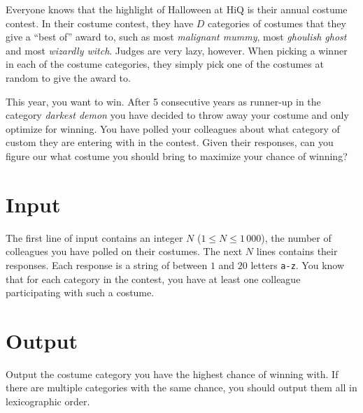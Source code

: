 
\noindent
Everyone knows that the highlight of Halloween at HiQ is their annual costume contest.
In their costume contest, they have $D$ categories of costumes that they give a ``best of'' award to, such as most \emph{malignant mummy}, most \emph{ghoulish ghost} and most \emph{wizardly witch}.
Judges are very lazy, however.
When picking a winner in each of the costume categories, they simply pick one of the costumes at random to give the award to.

This year, you want to win.
After 5 consecutive years as runner-up in the category \emph{darkest demon} you have decided to throw away your costume and only optimize for winning.
You have polled your colleagues about what category of custom they are entering with in the contest.
Given their responses, can you figure our what costume you should bring to maximize your chance of winning?

\section*{Input}
The first line of input contains an integer $N$ ($1 \le N \le 1\,000$), the number of colleagues you have polled on their costumes.
The next $N$ lines contains their responses.
Each response is a string of between $1$ and $20$ letters \texttt{a-z}.
You know that for each category in the contest, you have at least one colleague participating with such a costume.

\section*{Output}
Output the costume category you have the highest chance of winning with.
If there are multiple categories with the same chance, you should output them all in lexicographic order.
